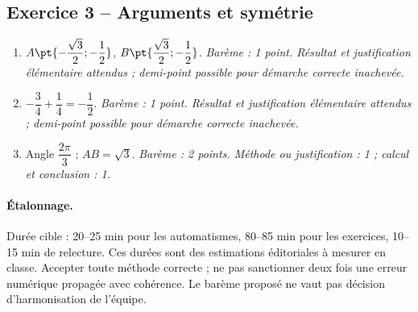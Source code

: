 \subsection*{Exercice 3 -- Arguments et symétrie}
\begin{enumerate}
\item $A\pt{-\dfrac{\sqrt 3}{2};-\dfrac{1}{2}}$, $B\pt{\dfrac{\sqrt 3}{2};-\dfrac{1}{2}}$. \textit{Barème : 1 point. Résultat et justification élémentaire attendus ; demi-point possible pour démarche correcte inachevée.}
\item $-\dfrac{3}{4}+\dfrac{1}{4}=-\dfrac{1}{2}$. \textit{Barème : 1 point. Résultat et justification élémentaire attendus ; demi-point possible pour démarche correcte inachevée.}
\item Angle $\dfrac{2\pi}{3}$ ; $AB=\sqrt3$. \textit{Barème : 2 points. Méthode ou justification : 1 ; calcul et conclusion : 1.}
\end{enumerate}
\paragraph{Étalonnage.} Durée cible : 20–25 min pour les automatismes, 80–85 min pour les exercices, 10–15 min de relecture. Ces durées sont des estimations éditoriales à mesurer en classe. Accepter toute méthode correcte ; ne pas sanctionner deux fois une erreur numérique propagée avec cohérence. Le barème proposé ne vaut pas décision d’harmonisation de l’équipe.
